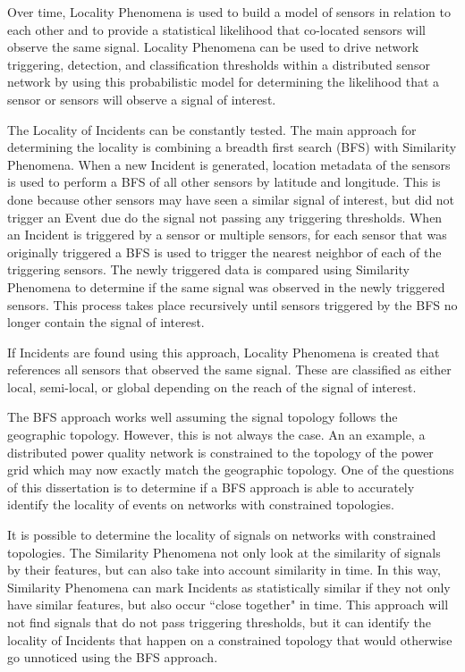 Over time, Locality Phenomena is used to build a model of sensors in relation to each other and to provide a statistical likelihood that co-located sensors will observe the same signal. Locality Phenomena can be used to drive network triggering, detection, and classification thresholds within a distributed sensor network by using this probabilistic model for determining the likelihood that a sensor or sensors will observe a signal of interest.

The Locality of Incidents can be constantly tested. The main approach for determining the locality is combining a breadth first search (BFS) with Similarity Phenomena. When a new Incident is generated, location metadata of the sensors is used to perform a BFS of all other sensors by latitude and longitude. This is done because other sensors may have seen a similar signal of interest, but did not trigger an Event due do the signal not passing any triggering thresholds. When an Incident is triggered by a sensor or multiple sensors, for each sensor that was originally triggered a BFS is used to trigger the nearest neighbor of each of the triggering sensors. The newly triggered data is compared using Similarity Phenomena to determine if the same signal was observed in the newly triggered sensors. This process takes place recursively until sensors triggered by the BFS no longer contain the signal of interest.

If Incidents are found using this approach, Locality Phenomena is created that references all sensors that observed the same signal. These are classified as either local, semi-local, or global depending on the reach of the signal of interest.

The BFS approach works well assuming the signal topology follows the geographic topology. However, this is not always the case. An an example, a distributed power quality network is constrained to the topology of the power grid which may now exactly match the geographic topology. One of the questions of this dissertation is to determine if a BFS approach is able to accurately identify the locality of events on networks with constrained topologies.

It is possible to determine the locality of signals on networks with constrained topologies. The Similarity Phenomena not only look at the similarity of signals by their features, but can also take into account similarity in time. In this way, Similarity Phenomena can mark Incidents as statistically similar if they not only have similar features, but also occur ``close together" in time. This approach will not find signals that do not pass triggering thresholds, but it can identify the locality of Incidents that happen on a constrained topology that would otherwise go unnoticed using the BFS approach.

